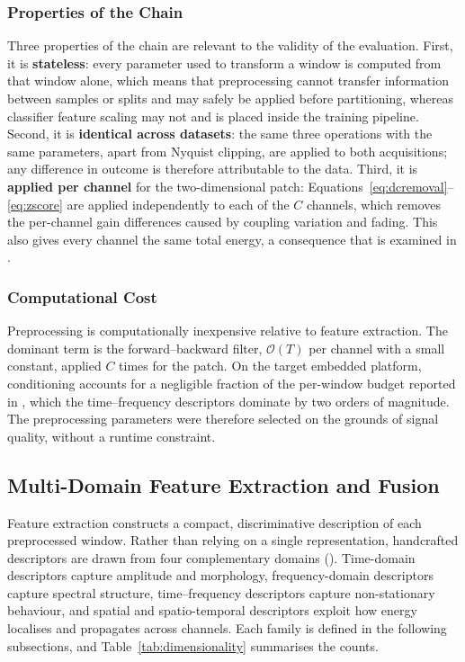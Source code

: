 \subsubsection{Properties of the Chain}
\label{sec:chap3PreprocProperties}
Three properties of the chain are relevant to the validity of the evaluation. First, it is \textbf{stateless}: every parameter used to transform a window is computed from that window alone, which means that preprocessing cannot transfer information between samples or splits and may safely be applied before partitioning, whereas classifier feature scaling may not and is placed inside the training pipeline. Second, it is \textbf{identical across datasets}: the same three operations with the same parameters, apart from Nyquist clipping, are applied to both acquisitions; any difference in outcome is therefore attributable to the data. Third, it is \textbf{applied per channel} for the two-dimensional patch: Equations~\eqref{eq:dcremoval}--\eqref{eq:zscore} are applied independently to each of the $C$ channels, which removes the per-channel gain differences caused by coupling variation and fading. This also gives every channel the same total energy, a consequence that is examined in .

\subsubsection{Computational Cost}
\label{sec:chap3PreprocCost}
Preprocessing is computationally inexpensive relative to feature extraction. The dominant term is the forward--backward filter, $\mathcal{O}(T)$ per channel with a small constant, applied $C$ times for the patch. On the target embedded platform, conditioning accounts for a negligible fraction of the per-window budget reported in , which the time--frequency descriptors dominate by two orders of magnitude. The preprocessing parameters were therefore selected on the grounds of signal quality, without a runtime constraint.

\subsection{Multi-Domain Feature Extraction and Fusion}
\label{sec:chap3Phase2}
Feature extraction constructs a compact, discriminative description of each preprocessed window. Rather than relying on a single representation, handcrafted descriptors are drawn from four complementary domains (). Time-domain descriptors capture amplitude and morphology, frequency-domain descriptors capture spectral structure, time--frequency descriptors capture non-stationary behaviour, and spatial and spatio-temporal descriptors exploit how energy localises and propagates across channels. Each family is defined in the following subsections, and Table~\ref{tab:dimensionality} summarises the counts.

